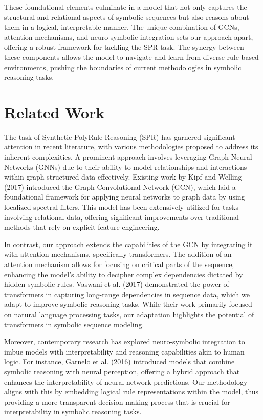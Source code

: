 \documentclass{article}
\begin{document}
These foundational elements culminate in a model that not only captures the structural and relational aspects of symbolic sequences but also reasons about them in a logical, interpretable manner. The unique combination of GCNs, attention mechanisms, and neuro-symbolic integration sets our approach apart, offering a robust framework for tackling the SPR task. The synergy between these components allows the model to navigate and learn from diverse rule-based environments, pushing the boundaries of current methodologies in symbolic reasoning tasks.

\section{Related Work}
The task of Synthetic PolyRule Reasoning (SPR) has garnered significant attention in recent literature, with various methodologies proposed to address its inherent complexities. A prominent approach involves leveraging Graph Neural Networks (GNNs) due to their ability to model relationships and interactions within graph-structured data effectively. Existing work by Kipf and Welling (2017) introduced the Graph Convolutional Network (GCN), which laid a foundational framework for applying neural networks to graph data by using localized spectral filters. This model has been extensively utilized for tasks involving relational data, offering significant improvements over traditional methods that rely on explicit feature engineering.

In contrast, our approach extends the capabilities of the GCN by integrating it with attention mechanisms, specifically transformers. The addition of an attention mechanism allows for focusing on critical parts of the sequence, enhancing the model's ability to decipher complex dependencies dictated by hidden symbolic rules. Vaswani et al. (2017) demonstrated the power of transformers in capturing long-range dependencies in sequence data, which we adapt to improve symbolic reasoning tasks. While their work primarily focused on natural language processing tasks, our adaptation highlights the potential of transformers in symbolic sequence modeling.

Moreover, contemporary research has explored neuro-symbolic integration to imbue models with interpretability and reasoning capabilities akin to human logic. For instance, Garnelo et al. (2016) introduced models that combine symbolic reasoning with neural perception, offering a hybrid approach that enhances the interpretability of neural network predictions. Our methodology aligns with this by embedding logical rule representations within the model, thus providing a more transparent decision-making process that is crucial for interpretability in symbolic reasoning tasks.
\end{document}
